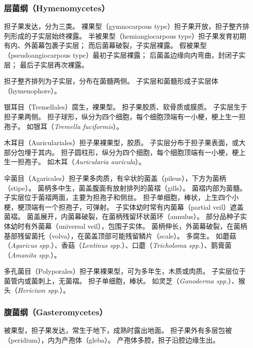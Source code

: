 \documentclass[11pt]{article}
\begin{document}
\subsubsection{层菌纲（Hymenomycetes）}
担子果发达，分为三类。
裸果型（gymnocarpous type）担子果开放，担子整齐排列形成的子实层始终裸露。
半被果型（hemiangiocarpous type）担子果发育初期有内、外菌幕包裹子实层；
而后菌幕破裂，子实层裸露。
假被果型（pseudoangiocarpous type）最初子实层裸露；
后菌盖边缘向内弯曲，封闭子实层；
最后子实层再次裸露。

\par

担子整齐排列为子实层，分布在菌髓两侧。
子实层和菌髓形成子实层体（hymenophore）。

\par

银耳目（Tremellales）腐生，裸果型。
担子果胶质、软骨质或膜质。
子实层生于担子果两侧。
担子球形，纵分为四个细胞，每个细胞顶端有一小梗，梗上生一担孢子。
如银耳（\textit{Tremella fuciformis}）。

\par

木耳目（Auriculariales）担子果裸果型，胶质。
子实层分布于担子果表面，或大部分包埋于其内。
担子圆柱形，纵分为四个细胞，每个细胞顶端有一小梗，梗上生一担孢子。
如木耳（\textit{Auricularia auricula}）。

\par

伞菌目（Agaricales）担子果多肉质，有伞状的菌盖（pileus），下方为菌柄（stipe）。
菌柄多中生，菌盖腹面有放射排列的菌褶（gills）。
菌褶内部为菌髓。
子实层位于菌褶两面，主要为担孢子和侧丝。
担子单细胞，棒状，上生四个小梗，梗顶端有一个担孢子，可弹射。
子实体幼时常有内菌幕（partial veil）遮盖菌褶。
菌盖展开，内菌幕破裂，在菌柄残留环状菌环（annulus）。
部分品种子实体幼时有外菌幕（universal veil），包围子实体。
菌柄伸长，外菌幕破裂，在菌柄基部残留菌托（volva），在菌盖顶部可能残留鳞片（scale）。
多腐生。
如蘑菇（\textit{Agaricus spp.}）、香菇（\textit{Lentinus spp.}）、口蘑（\textit{Tricholoma spp.}）、鹅膏菌（\textit{Amanita spp.}）。

\par

多孔菌目（Polyporales）担子果裸果型，可为多年生，木质或肉质。
子实层位于菌管内或菌刺上，无菌褶。
担子单细胞，棒状。
如灵芝（\textit{Ganoderma spp.}）、猴头（\textit{Hericium spp.}）。

\subsubsection{腹菌纲（Gasteromycetes）}
被果型，担子果发达，常生于地下，成熟时露出地面。
担子果外有多层包被（peridium），内为产孢体（gleba）。
产孢体多腔，担子沿腔边缘生出。
\end{document}
